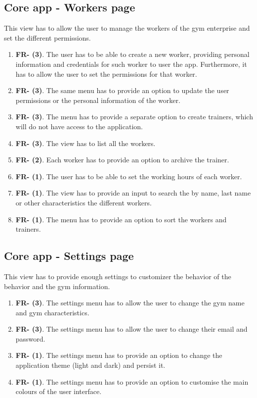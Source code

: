 \documentclass[a4paper, 12pt, oneside]{book}
\begin{document}
\subsection{Core app - Workers page}
This view has to allow the user to manage the workers of the gym enterprise and set the different permissions.
\begin{enumerate}[label = -]
	\item \textbf{FR- (3)}. The user has to be able to create a new worker, providing personal information and credentials for such worker to user the app. Furthermore, it has to allow the user to set the permissions for that worker.
	\item \textbf{FR- (3)}. The same menu has to provide an option to update the user permissions or the personal information of the worker.
	\item \textbf{FR- (3)}. The menu has to provide a separate option to create trainers, which will do not have access to the application.
	\item \textbf{FR- (3)}. The view has to list all the workers.
	\item \textbf{FR- (2)}. Each worker has to provide an option to archive the trainer.
	\item \textbf{FR- (1)}. The user has to be able to set the working hours of each worker.
	\item \textbf{FR- (1)}. The view has to provide an input to search the by name, last name or other characteristics the different workers.
	\item \textbf{FR- (1)}. The menu has to provide an option to sort the workers and trainers.
\end{enumerate}
\subsection{Core app - Settings page}
This view has to provide enough settings to customizer the behavior of the behavior and the gym information.
\begin{enumerate}[label = -]
	\item \textbf{FR- (3)}. The settings menu has to allow the user to change the gym name and gym characteristics.
	\item \textbf{FR- (3)}. The settings menu has to allow the user to change their email and password.
	\item \textbf{FR- (1)}. The settings menu has to provide an option to change the application theme (light and dark) and persist it.
	\item \textbf{FR- (1)}. The settings menu has to provide an option to customise the main colours of the user interface.
\end{enumerate}
\end{document}
